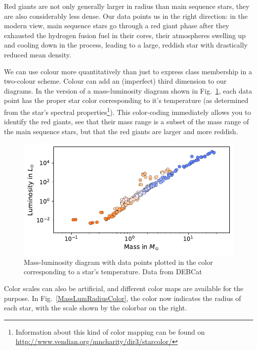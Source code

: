 \documentclass[twocolumn,apj]{openjournal}
\begin{document}
Red giants are not only generally larger in radius than main sequence stars, they are also considerably less dense. Our data points us in the right direction: in the modern view, main sequence stars go through a red giant phase after they exhausted the hydrogen fusion fuel in their cores, their atmospheres swelling up and cooling down in the process, leading to a large, reddish star with drastically reduced mean density.

We can use colour more quantitatively than just to express class membership in a two-colour scheme. Colour can add an (imperfect) third dimension to our diagrams. In the version of a mass-luminosity diagram shown in Fig.~\ref{MassLumColor}, each data point has the proper star color corresponding to it's temperature (as determined from the star's spectral properties\footnote{Information about this kind of color mapping can be found on \href{http://www.vendian.org/mncharity/dir3/starcolor/}{http://www.vendian.org/mncharity/dir3/starcolor/}}). This color-coding immediately allows you to identify the red giants, see that their mass range is a subset of the mass range of the main sequence stars, but that the red giants are larger and more reddish.
\begin{figure}[htbp]
\begin{center}
\includegraphics[width=0.9\linewidth]{masse-leuchtkraft-color-DEB.pdf}
\caption{Mass-luminosity diagram with data points plotted in the color corresponding to a star's temperature. Data from DEBCat}
\label{MassLumColor}
\end{center}
\end{figure}
Color scales can also be artificial, and different color maps are available for the purpose.  In Fig.~\ref{MassLumRadiusColor}, the color now indicates the radius of each star, with the scale shown by the colorbar on the right.
\end{document}
